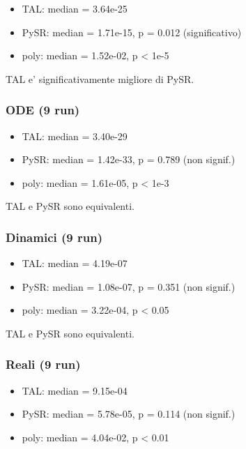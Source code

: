 \documentclass[
]{article}
\providecommand{\tightlist}{%
  \setlength{\itemsep}{0pt}\setlength{\parskip}{0pt}}
\begin{document}
\begin{itemize}
\tightlist
\item
  TAL: median = 3.64e-25
\item
  PySR: median = 1.71e-15, p = 0.012 (significativo)
\item
  poly: median = 1.52e-02, p \textless{} 1e-5
\end{itemize}

TAL e' significativamente migliore di PySR.

\subsubsection{ODE (9 run)}\label{ode-9-run}

\begin{itemize}
\tightlist
\item
  TAL: median = 3.40e-29
\item
  PySR: median = 1.42e-33, p = 0.789 (non signif.)
\item
  poly: median = 1.61e-05, p \textless{} 1e-3
\end{itemize}

TAL e PySR sono equivalenti.

\subsubsection{Dinamici (9 run)}\label{dinamici-9-run}

\begin{itemize}
\tightlist
\item
  TAL: median = 4.19e-07
\item
  PySR: median = 1.08e-07, p = 0.351 (non signif.)
\item
  poly: median = 3.22e-04, p \textless{} 0.05
\end{itemize}

TAL e PySR sono equivalenti.

\subsubsection{Reali (9 run)}\label{reali-9-run}

\begin{itemize}
\tightlist
\item
  TAL: median = 9.15e-04
\item
  PySR: median = 5.78e-05, p = 0.114 (non signif.)
\item
  poly: median = 4.04e-02, p \textless{} 0.01
\end{itemize}
\end{document}
